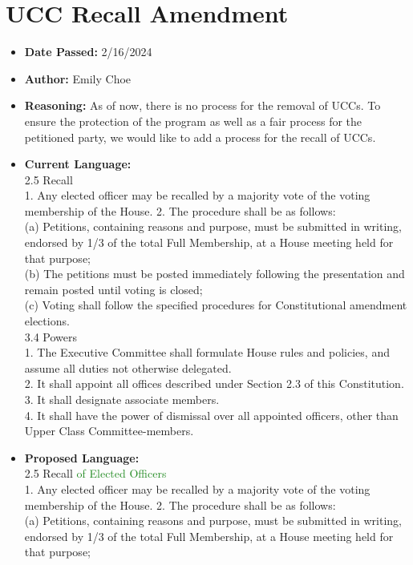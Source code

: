 \documentclass[10pt]{article} %
\begin{document}
\section{UCC Recall Amendment}
\begin{itemize}
	\item \textbf{Date Passed:} 2/16/2024
	\item \textbf{Author:} Emily Choe
	\item \textbf{Reasoning:} As of now, there is no process for the removal of UCCs. To ensure the protection of the program as well as a fair process for the petitioned party, we would like to add a process for the recall of UCCs.
	\item \textbf{Current Language:} \\
	2.5 Recall \\
	1. Any elected officer may be recalled by a majority vote of the voting membership of the House. 2. The procedure shall be as follows: \\
	(a) Petitions, containing reasons and purpose, must be submitted in writing, endorsed by 1/3 of the total Full Membership, at a House meeting held for that purpose; \\
	(b) The petitions must be posted immediately following the presentation and remain posted until voting is closed; \\
	(c) Voting shall follow the specified procedures for Constitutional amendment elections. \\
	3.4 Powers \\
	1. The Executive Committee shall formulate House rules and policies, and assume all duties not otherwise delegated. \\
	2. It shall appoint all offices described under Section 2.3 of this Constitution. \\
	3. It shall designate associate members. \\
	4. It shall have the power of dismissal over all appointed officers, other than Upper Class Committee-members.
	\item \textbf{Proposed Language:} \\
	2.5 Recall \textcolor{ForestGreen}{of Elected Officers} \\
	1. Any elected officer may be recalled by a majority vote of the voting membership of the House. 2. The procedure shall be as follows: \\
	(a) Petitions, containing reasons and purpose, must be submitted in writing, endorsed by 1/3 of the total Full Membership, at a House meeting held for that purpose; \\

\end{itemize}
\end{document}

